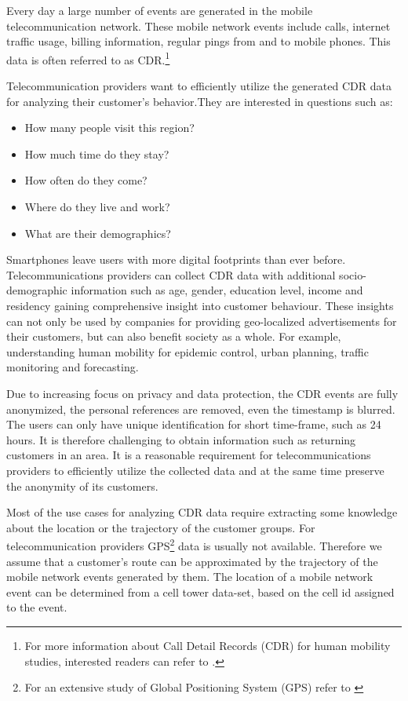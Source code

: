 Every day a large number of events are generated in the mobile telecommunication network. These mobile network events include calls, internet traffic usage, billing information, regular pings from and to mobile phones. This data is often referred to as CDR.\footnote{For more
information about Call Detail Records (CDR) for human mobility studies, interested readers can refer to \cite{spatiotemp}.} 

Telecommunication providers want to efficiently utilize the generated CDR data for analyzing their customer's behavior.They are interested in questions such as:
\begin{itemize}
\item How many people visit this region?
\item How much time do they stay?
\item How often do they come?
\item Where do they live and work?
\item What are their demographics?
\end{itemize}

Smartphones leave users with more digital footprints than ever before. Telecommunications providers can collect CDR data with additional socio-demographic information such as age, gender, education level, income and residency gaining comprehensive insight into customer behaviour. These insights can not only be used by companies for providing geo-localized advertisements for their customers, but can also benefit society as a whole. For example, understanding human mobility for epidemic control, urban planning, traffic monitoring and forecasting.

Due to increasing focus on privacy and data protection, the CDR events are fully anonymized, the personal references are removed, even the timestamp is blurred. The users can only have unique identification for short time-frame, such as 24 hours. It is therefore challenging to obtain information such as returning customers in an area. It is a reasonable requirement for telecommunications providers to efficiently utilize the collected data and at the same time preserve the anonymity of its customers. 

Most of the use cases for analyzing CDR data require extracting some knowledge about the location or the trajectory of the customer groups. For telecommunication providers GPS\footnote{For an extensive study of Global Positioning System (GPS) refer to \cite{gps}} data is usually not available. Therefore we assume that a customer's route can be approximated by the trajectory of the mobile network events generated by them. The location of a mobile network event can be determined from a cell tower data-set, based on the cell id assigned to the event.

